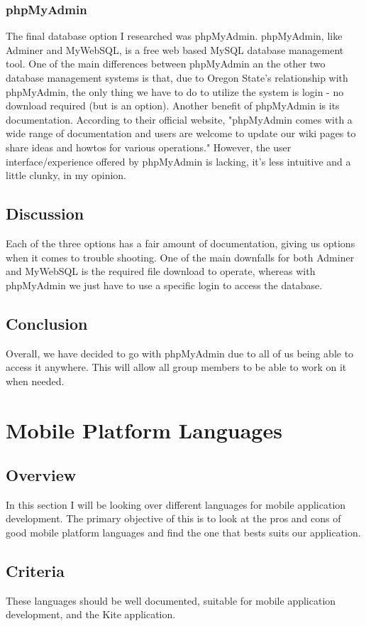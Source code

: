 \documentclass[compsoc, 10, draftclsnofoot, onecolumn]{IEEEtran}
\begin{document}
\subsubsection{phpMyAdmin} 
\indent The final database option I researched was phpMyAdmin. phpMyAdmin, like Adminer and MyWebSQL, is a free web based MySQL database management tool. One of the main differences between phpMyAdmin an the other two database management systems is that, due to Oregon State's relationship with phpMyAdmin, the only thing we have to do to utilize the system is login - no download required (but is an option). Another benefit of phpMyAdmin is its documentation. According to their official website, "phpMyAdmin comes with a wide range of documentation and users are welcome to update our wiki pages to share ideas and howtos for various operations\cite{r3}." However, the user interface/experience offered by phpMyAdmin is lacking, it's less intuitive and a little clunky, in my opinion.   
\subsection{Discussion} Each of the three options has a fair amount of documentation, giving us options when it comes to trouble shooting. One of the main downfalls for both Adminer and MyWebSQL is the required file download to operate, whereas with phpMyAdmin we just have to use a specific login to access the database. 
\subsection{Conclusion} Overall, we have decided to go with phpMyAdmin due to all of us being able to access it anywhere. This will allow all group members to be able to work on it when needed.
\section{\textbf{Mobile Platform Languages}}
\subsection{Overview} In this section I will be looking over different languages for mobile application development. The primary objective of this is to look at the pros and cons of good mobile platform languages and find the one that bests suits our application.  
\subsection{Criteria} These languages should be well documented, suitable for mobile application development, and the Kite application.
\end{document}
